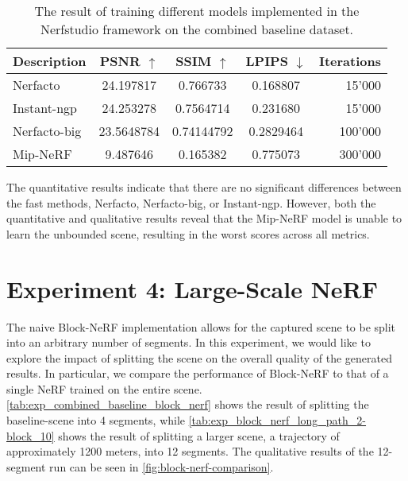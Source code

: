\begin{table}[ht]
\centering
\setlength{\tabcolsep}{6pt}
\renewcommand{\arraystretch}{1.5}
\begin{tabular}{l | C{2.2} C{1.3} C{1.3} | r}
\hline
\textbf{Description} & \textbf{PSNR $\uparrow$} & \textbf{SSIM $\uparrow$} & \textbf{LPIPS $\downarrow$} & \textbf{Iterations} \\
\hline
Nerfacto        & 24.197817                     & 0.766733     & 0.168807 & 15'000 \\
Instant-ngp     & 24.253278   & 0.7564714                     & 0.231680 & 15'000 \\
Nerfacto-big    & 23.5648784     & 0.74144792     & 0.2829464 & 100'000 \\
Mip-NeRF        & 9.487646 & 0.165382 & 0.775073 & 300'000 \\
\hline
\end{tabular}
\caption[Results for experiment 3: Different models]{The result of training different models implemented in the Nerfstudio framework on the combined baseline dataset.}
\label{tab:different-models}
\end{table}



The quantitative results indicate that there are no significant differences between the fast methods, Nerfacto, Nerfacto-big, or Instant-ngp. However, both the quantitative and qualitative results reveal that the Mip-NeRF model is unable to learn the unbounded scene, resulting in the worst scores across all metrics.









\section{Experiment 4: Large-Scale NeRF}

The naive Block-NeRF implementation allows for the captured scene to be split into an arbitrary number of segments. In this experiment, we would like to explore the impact of splitting the scene on the overall quality of the generated results. In particular, we compare the performance of Block-NeRF to that of a single NeRF trained on the entire scene. \autoref{tab:exp_combined_baseline_block_nerf} shows the result of splitting the baseline-scene into 4 segments, while \autoref{tab:exp_block_nerf_long_path_2-block_10} shows the result of splitting a larger scene, a trajectory of approximately 1200 meters, into 12 segments. The qualitative results of the 12-segment run can be seen in \autoref{fig:block-nerf-comparison}.

